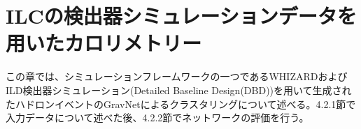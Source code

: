 \section{ILCの検出器シミュレーションデータを用いたカロリメトリー}
この章では、シミュレーションフレームワークの一つであるWHIZARDおよびILD検出器シミュレーション(Detailed Baseline Design(DBD))を用いて生成されたハドロンイベントのGravNetによるクラスタリングについて述べる。4.2.1節で入力データについて述べた後、4.2.2節でネットワークの評価を行う。

